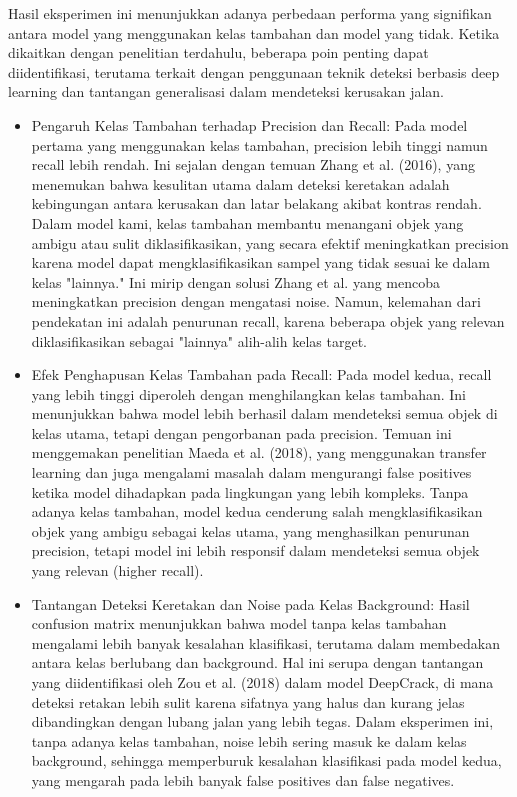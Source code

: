 \documentclass[12pt,a4paper]{article}
\begin{document}
\begin{adjustwidth}{3em}{0pt}
\hspace{0.5cm} Hasil eksperimen ini menunjukkan adanya perbedaan performa yang signifikan antara model yang menggunakan kelas tambahan dan model yang tidak. Ketika dikaitkan dengan penelitian terdahulu, beberapa poin penting dapat diidentifikasi, terutama terkait dengan penggunaan teknik deteksi berbasis deep learning dan tantangan generalisasi dalam mendeteksi kerusakan jalan.
\begin{itemize}
    \item Pengaruh Kelas Tambahan terhadap Precision dan Recall: Pada model pertama yang menggunakan kelas tambahan, precision lebih tinggi namun recall lebih rendah. Ini sejalan dengan temuan Zhang et al. (2016), yang menemukan bahwa kesulitan utama dalam deteksi keretakan adalah kebingungan antara kerusakan dan latar belakang akibat kontras rendah. Dalam model kami, kelas tambahan membantu menangani objek yang ambigu atau sulit diklasifikasikan, yang secara efektif meningkatkan precision karena model dapat mengklasifikasikan sampel yang tidak sesuai ke dalam kelas "lainnya." Ini mirip dengan solusi Zhang et al. yang mencoba meningkatkan precision dengan mengatasi noise. Namun, kelemahan dari pendekatan ini adalah penurunan recall, karena beberapa objek yang relevan diklasifikasikan sebagai "lainnya" alih-alih kelas target.

    \item Efek Penghapusan Kelas Tambahan pada Recall: Pada model kedua, recall yang lebih tinggi diperoleh dengan menghilangkan kelas tambahan. Ini menunjukkan bahwa model lebih berhasil dalam mendeteksi semua objek di kelas utama, tetapi dengan pengorbanan pada precision. Temuan ini menggemakan penelitian Maeda et al. (2018), yang menggunakan transfer learning dan juga mengalami masalah dalam mengurangi false positives ketika model dihadapkan pada lingkungan yang lebih kompleks. Tanpa adanya kelas tambahan, model kedua cenderung salah mengklasifikasikan objek yang ambigu sebagai kelas utama, yang menghasilkan penurunan precision, tetapi model ini lebih responsif dalam mendeteksi semua objek yang relevan (higher recall).

    \item Tantangan Deteksi Keretakan dan Noise pada Kelas Background: Hasil confusion matrix menunjukkan bahwa model tanpa kelas tambahan mengalami lebih banyak kesalahan klasifikasi, terutama dalam membedakan antara kelas berlubang dan background. Hal ini serupa dengan tantangan yang diidentifikasi oleh Zou et al. (2018) dalam model DeepCrack, di mana deteksi retakan lebih sulit karena sifatnya yang halus dan kurang jelas dibandingkan dengan lubang jalan yang lebih tegas. Dalam eksperimen ini, tanpa adanya kelas tambahan, noise lebih sering masuk ke dalam kelas background, sehingga memperburuk kesalahan klasifikasi pada model kedua, yang mengarah pada lebih banyak false positives dan false negatives.


\end{itemize}
\end{adjustwidth}
\end{document}
